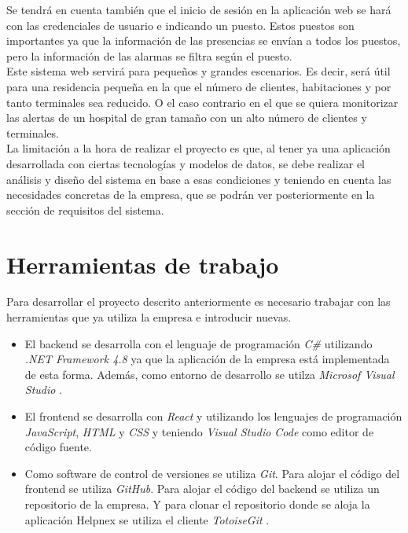 Se tendrá en cuenta también que el inicio de sesión en la aplicación web se hará con las credenciales de usuario e indicando un puesto. Estos puestos son importantes ya que la información de las presencias se envían a todos los puestos, pero la información de las alarmas se filtra según el puesto.\\

Este sistema web servirá para pequeños y grandes escenarios. Es decir, será útil para una residencia pequeña en la que el número de clientes, habitaciones y por tanto terminales sea reducido. O el caso contrario en el que se quiera monitorizar las alertas de un hospital de gran tamaño con un alto número de clientes y terminales.\\


La limitación a la hora de realizar el proyecto es que, al tener ya una aplicación desarrollada con ciertas tecnologías y modelos de datos, se debe realizar el análisis y diseño del sistema en base a esas condiciones y teniendo en cuenta las necesidades concretas de la empresa, que se podrán ver posteriormente en la sección de requisitos del sistema.


\section{Herramientas de trabajo}


Para desarrollar el proyecto descrito anteriormente es necesario trabajar con las herramientas que ya utiliza la empresa e introducir nuevas.

\begin{itemize}
    \item El backend se desarrolla con el lenguaje de programación \textit{C\#} utilizando \textit{.NET Framework 4.8} \cite{net-framework} ya que la aplicación de la empresa está implementada de esta forma. Además, como entorno de desarrollo se utilza \textit{Microsof Visual Studio} \cite{vs}.
    \item El frontend se desarrolla con \textit{React} \cite{react} y utilizando los lenguajes de programación \textit{JavaScript}, \textit{HTML} y \textit{CSS} y teniendo \textit{Visual Studio Code} \cite{vscode} como editor de código fuente.
    \item Como software de control de versiones se utiliza \textit{Git}. Para alojar el código del frontend se utiliza \textit{GitHub}. Para alojar el código del backend se utiliza un repositorio de la empresa. Y para clonar el repositorio donde se aloja la aplicación Helpnex se utiliza el cliente \textit{TotoiseGit} \cite{tortoise-git}.
\end{itemize}

